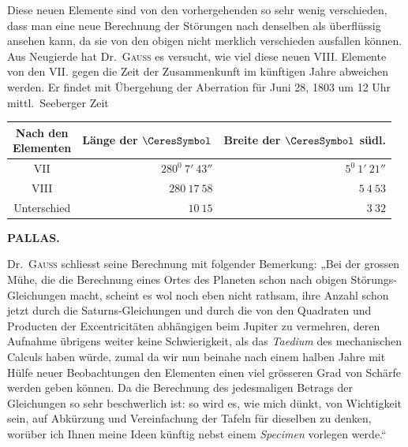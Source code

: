 Diese neuen Elemente sind von den vorhergehenden so sehr wenig verschieden, dass man eine neue Berechnung der Störungen nach denselben als überflüssig ansehen kann, da sie von den obigen nicht merklich verschieden ausfallen können. Aus Neugierde hat Dr.\ \textsc{Gauss} es versucht, wie viel diese neuen VIII. Elemente von den VII. gegen die Zeit der Zusammenkunft im künftigen Jahre abweichen werden. Er findet mit Übergehung der Aberration für Juni 28, 1803 um 12 Uhr mittl.\ Seeberger Zeit
\begin{center}
\begin{tabular}{c|r|r}
\shortstack{Nach den\\Elementen}&Länge der $\CeresSymbol$&\shortstack{Breite der $\CeresSymbol$\\südl.}\\\hline
VII&$280^0\ 7'\ 43''$&$5^0\ 1'\ 21''$\\
VIII&$280\ 17\ 58$&$5\ 4\ 53$\\\hline
Unterschied&$10\ 15$&$3\ 32$
\end{tabular}
\end{center}
\par{}
\par\clearpage
\thispagestyle{empty}
\noindent{}%
%
\parbox[t]{\dimexpr\linewidth-24mm\relax}{\centering\footnotesize\bfseries PALLAS.\par}%
\makebox[12mm][r]{}\par\nobreak\medskip
\indent Dr.\ \textsc{Gauss} schliesst seine Berechnung mit folgender Bemerkung: „Bei der grossen Mühe, die die Berechnung eines Ortes des Planeten schon nach obigen Störungs-Gleichungen macht, scheint es wol noch eben nicht rathsam, ihre Anzahl schon jetzt durch die Saturns-Gleichungen und durch die von den Quadraten und Producten der Excentricitäten abhängigen beim Jupiter zu vermehren, deren Aufnahme übrigens weiter keine Schwierigkeit, als das \textit{Taedium} des mechanischen Calculs haben würde, zumal da wir nun beinahe nach einem halben Jahre mit Hülfe neuer Beobachtungen den Elementen einen viel grösseren Grad von Schärfe werden geben können. Da die Berechnung des jedesmaligen Betrags der Gleichungen so sehr beschwerlich ist: so wird es, wie mich dünkt, von Wichtigkeit sein, auf Abkürzung und Vereinfachung der Tafeln für dieselben zu denken, worüber ich Ihnen meine Ideen künftig nebst einem \textit{Specimen} vorlegen werde.“
\begin{flushright}\end{flushright}

